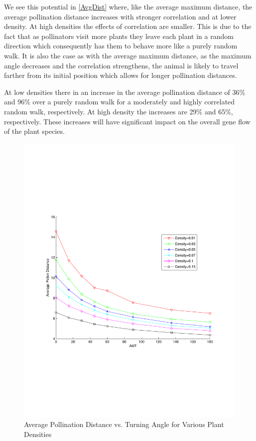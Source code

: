 We see this potential in \autoref{AvgDist} where, like the average maximum distance, the average pollination distance increases with stronger correlation and at lower density.  At high densities the effects of correlation are smaller.  This is due to the fact that as pollinators visit more plants they leave each plant in a random direction which consequently has them to behave more like a purely random walk.  It is also the case as with the average maximum distance, as the
maximum angle decreases and the correlation strengthens, the animal is likely to travel farther from its initial position which
allows for longer pollination distances.

At low densities there in an increase in the average pollination distance of 36\% and 96\% over a purely random walk for a moderately and highly correlated random walk, respectively.  At high density the increases are 29\% and 65\%, respectively.  These increases will have significant impact on the overall gene flow of the plant species.

\begin{figure}
  \begin{center}
  \includegraphics[scale=0.5, trim=50 240 50 300]{PollenDVsAMT.pdf}
  \end{center}
  \caption{\small Average Pollination Distance vs. Turning Angle for Various Plant Densities}
  \label{AvgDist}
\end{figure}



